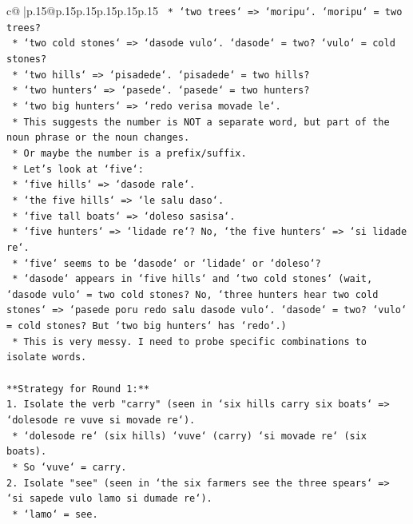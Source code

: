 \documentclass{article}
\begin{document}
{\begin{supertabular}{c@{$\;$}|p{.15\linewidth}@{}p{.15\linewidth}p{.15\linewidth}p{.15\linewidth}p{.15\linewidth}p{.15\linewidth}}
{{{\texttt{    *   `two trees` => `moripu`. `moripu` = two trees?} \\
\texttt{    *   `two cold stones` => `dasode vulo`. `dasode` = two? `vulo` = cold stones?} \\
\texttt{    *   `two hills` => `pisadede`. `pisadede` = two hills?} \\
\texttt{    *   `two hunters` => `pasede`. `pasede` = two hunters?} \\
\texttt{    *   `two big hunters` => `redo verisa movade le`.} \\
\texttt{    *   This suggests the number is NOT a separate word, but part of the noun phrase or the noun changes.} \\
\texttt{    *   Or maybe the number is a prefix/suffix.} \\
\texttt{    *   Let's look at `five`:} \\
\texttt{        *   `five hills` => `dasode rale`.} \\
\texttt{        *   `the five hills` => `le salu daso`.} \\
\texttt{        *   `five tall boats` => `doleso sasisa`.} \\
\texttt{        *   `five hunters` => `lidade re`? No, `the five hunters` => `si lidade re`.} \\
\texttt{        *   `five` seems to be `dasode` or `lidade` or `doleso`?} \\
\texttt{        *   `dasode` appears in `five hills` and `two cold stones` (wait, `dasode vulo` = two cold stones? No, `three hunters hear two cold stones` => `pasede poru redo salu dasode vulo`. `dasode` = two? `vulo` = cold stones? But `two big hunters` has `redo`.)} \\
\texttt{        *   This is very messy. I need to probe specific combinations to isolate words.} \\
\\ 
\texttt{**Strategy for Round 1:**} \\
\texttt{1.  Isolate the verb "carry" (seen in `six hills carry six boats` => `dolesode re vuve si movade re`).} \\
\texttt{    *   `dolesode re` (six hills) `vuve` (carry) `si movade re` (six boats).} \\
\texttt{    *   So `vuve` = carry.} \\
\texttt{2.  Isolate "see" (seen in `the six farmers see the three spears` => `si sapede vulo lamo si dumade re`).} \\
\texttt{    *   `lamo` = see.} \\
}}}
\end{supertabular}}
\end{document}
